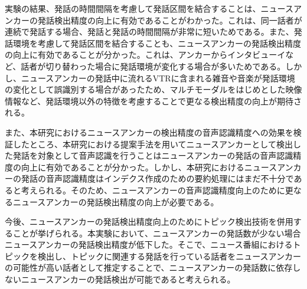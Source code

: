 実験の結果、発話の時間間隔を考慮して発話区間を結合することは、ニュースアンカーの発話検出精度の向上に有効であることがわかった。これは、同一話者が連続で発話する場合、発話と発話の時間間隔が非常に短いためである。また、発話環境を考慮して発話区間を結合することも、ニュースアンカーの発話検出精度の向上に有効であることが分かった。これは、アンカーからインタビューイなど、話者が切り替わった場合に発話環境が変化する場合が多いためである。しかし、ニュースアンカーの発話中に流れるVTRに含まれる雑音や音楽が発話環境の変化として誤識別する場合があったため、マルチモーダルをはじめとした映像情報など、発話環境以外の特徴を考慮することで更なる検出精度の向上が期待される。\par
また、本研究におけるニュースアンカーの検出精度の音声認識精度への効果を検証したところ、本研究における提案手法を用いてニュースアンカーとして検出した発話を対象として音声認識を行うことはニュースアンカーの発話の音声認識精度の向上に有効であることが分かった。しかし、本研究におけるニュースアンカーの発話の音声認識精度はインデクス作成のための要約処理にはまだ不十分であると考えられる。そのため、ニュースアンカーの音声認識精度向上のために更なるニュースアンカーの発話検出精度の向上が必要である。

今後、ニュースアンカーの発話検出精度向上のためにトピック検出技術を併用することが挙げられる。本実験において、ニュースアンカーの発話数が少ない場合ニュースアンカーの発話検出精度が低下した。そこで、ニュース番組におけるトピックを検出し、トピックに関連する発話を行っている話者をニュースアンカーの可能性が高い話者として推定することで、ニュースアンカーの発話数に依存しないニュースアンカーの発話検出が可能であると考えられる。\par
\begin{comment}
また、ニュース番組のインデクシングを実現するためにはニュースアンカーの発話の検出以外に、アンカーの発話内容を推定する必要がある。現在、「発話区間」「発話者」「発話内容」の全てが未知であるとき、ニュースアンカーの発話の音声認識精度はインデックスの作成に十分とは言えない。特に、ニュースアンカーの発話の音声認識精度が低下した理由として、ニュース番組内のVTRの存在がある。本研究で用いた音声認識システムでは雑音や音楽が同時に収録されていた場合、音声認識精度が極端に低下したため、ニュース番組音声から雑音除去を行う、雑音や音楽に頑健な音声認識システムを構築するなどを行う必要があると考えられる。
\end{comment}

\begin{comment}
ニュースアンカーの発話数によって発話の検出精度が低下した理由として、本研究で用いたニュースアンカーの発話検出手法がニュース番組内において、ニュースアンカーの発話が非常に多いことに着目した手法であるためである。このため、発話の少ないニュースアンカーの発話を十分に検出できず、検出精度が低下したと考えられる。\par
\end{comment}

